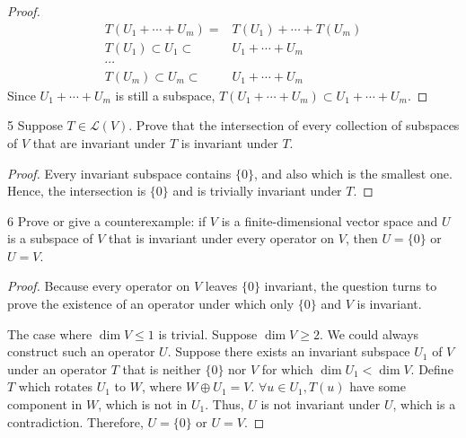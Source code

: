 \documentclass{article}
\newenvironment{problem}[1]{\begin{prob*}{#1}{}}{\end{prob*}}
\begin{document}
\begin{proof}
	\begin{align*}
		T(U_1 + \cdots+ U_m) =     & T(U_1) + \cdots + T(U_m) \\
		T(U_1) \subset U_1 \subset & U_1 + \cdots + U_m       \\
		\cdots                                                \\
		T(U_m) \subset U_m \subset & U_1 + \cdots + U_m
	\end{align*}
	Since $U_1 + \cdots + U_m$ is still a subspace, $T(U_1 + \cdots + U_m) \subset U_1 + \cdots + U_m$.
\end{proof}

\newpage

\begin{problem}{5}
Suppose $T \in \mathcal{L}(V)$. Prove that the intersection of every collection of subspaces of $V$ that are invariant under $T$ is invariant under $T$.
\end{problem}

\begin{proof}
	Every invariant subspace contains $\{0\}$, and also which is the smallest one. Hence, the intersection is $\{0\}$ and is trivially invariant under $T$.
\end{proof}

\begin{problem}{6}
Prove or give a counterexample: if $V$ is a finite-dimensional vector space and $U$ is a subspace of $V$ that is invariant under every operator on $V$, then $U = \{0\}$ or $U = V$.
\end{problem}

\begin{proof}
	Because every operator on $V$ leaves $\{0\}$ invariant, the question turns to prove the existence of an operator under which only $\{0\}$ and $V$ is invariant.

	The case where $\operatorname{dim} V \le 1$ is trivial.
	Suppose $\operatorname{dim} V \ge 2$. We could always construct such an operator $U$. Suppose there exists an invariant subspace $U_1$ of $V$ under an operator $T$ that is neither $\{0\}$ nor $V$ for which $\operatorname{dim} U_1 < \operatorname{dim} V$. Define $T$ which rotates $U_1$ to $W$, where $W \oplus U_1 = V$. $\forall u \in U_1, T(u)$ have some component in $W$, which is not in $U_1$. Thus, $U$ is not invariant under $U$, which is a contradiction. Therefore, $U = \{0\}$ or $U = V$.
\end{proof}
\end{document}
